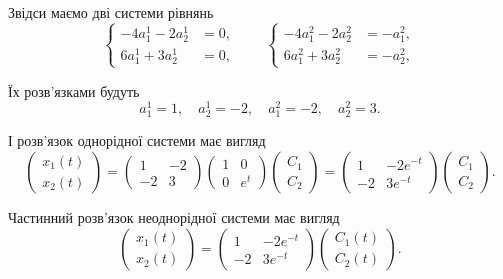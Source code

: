 \begin{solution}
	Звідси маємо дві системи рівнянь
	\begin{equation*}
		\left\{
			\begin{aligned}
				- 4 a_1^1 - 2 a_2^1 &= 0, \\
				6 a_1^1 + 3 a_2^1 &= 0,
			\end{aligned}
		\right.
		\qquad
		\left\{
			\begin{aligned}
				- 4 a_1^2 - 2 a_2^2 &= -a_1^2, \\
				6 a_1^2 + 3 a_2^2 &= -a_2^2,
			\end{aligned}
		\right.
	\end{equation*}

	Їх розв'язками будуть
	\begin{equation*}
		a_1^1 = 1, \quad a_2^1 = -2, \quad a_1^2 = -2, \quad a_2^2 = 3.
	\end{equation*}

	І розв'язок однорідної системи має вигляд
	\begin{equation*}
		\begin{pmatrix} x_1(t) \\ x_2(t) \end{pmatrix} = \begin{pmatrix} 1 & -2 \\ -2 & 3 \end{pmatrix} \begin{pmatrix} 1 & 0 \\ 0 & e^t \end{pmatrix} \begin{pmatrix} C_1 \\ C_2 \end{pmatrix} = \begin{pmatrix} 1 & -2e^{-t} \\ -2 & 3e^{-t} \end{pmatrix} \begin{pmatrix} C_1 \\ C_2 \end{pmatrix}.
	\end{equation*}

	Частинний розв'язок неоднорідної системи має вигляд
	\begin{equation*}
		\begin{pmatrix} x_1(t) \\ x_2(t) \end{pmatrix} = \begin{pmatrix} 1 & -2e^{-t} \\ -2 & 3e^{-t} \end{pmatrix} \begin{pmatrix} C_1(t) \\ C_2(t) \end{pmatrix}.
	\end{equation*}


\end{solution}
